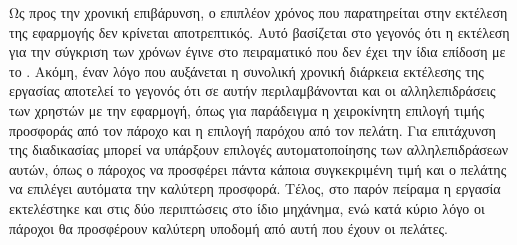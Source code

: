 Ως προς την χρονική επιβάρυνση, ο επιπλέον χρόνος που παρατηρείται στην εκτέλεση της εφαρμογής δεν κρίνεται αποτρεπτικός. Αυτό βασίζεται στο γεγονός ότι η εκτέλεση για την σύγκριση των χρόνων έγινε στο πειραματικό  που δεν έχει την ίδια επίδοση με το . Ακόμη, έναν λόγο που αυξάνεται η συνολική χρονική διάρκεια εκτέλεσης της εργασίας αποτελεί το γεγονός ότι σε αυτήν περιλαμβάνονται και οι αλληλεπιδράσεις των χρηστών με την εφαρμογή, όπως για παράδειγμα η χειροκίνητη επιλογή τιμής προσφοράς από τον πάροχο και η επιλογή παρόχου από τον πελάτη. Για επιτάχυνση της διαδικασίας μπορεί να υπάρξουν επιλογές αυτοματοποίησης των αλληλεπιδράσεων αυτών, όπως ο πάροχος να προσφέρει πάντα κάποια συγκεκριμένη τιμή και ο πελάτης να επιλέγει αυτόματα την καλύτερη προσφορά. Τέλος, στο παρόν πείραμα η εργασία εκτελέστηκε και στις δύο περιπτώσεις στο ίδιο μηχάνημα, ενώ κατά κύριο λόγο οι πάροχοι θα προσφέρουν καλύτερη υποδομή από αυτή που έχουν οι πελάτες. 